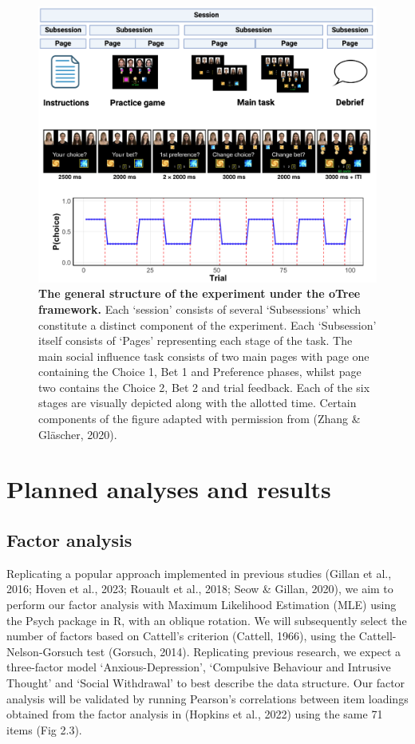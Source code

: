 \documentclass[12pt,a4paper,oneside,]{book} %
\begin{document}
\begin{figure}
\includegraphics[width=1\linewidth]{figures/otree_experiment} \caption{{\textbf{The general structure of the experiment under the oTree framework.} Each `session' consists of several `Subsessions' which constitute a distinct component of the experiment. Each `Subsession' itself consists of `Pages' representing each stage of the task. The main social influence task consists of two main pages with page one containing the Choice 1, Bet 1 and Preference phases, whilst page two contains the Choice 2, Bet 2 and trial feedback. Each of the six stages are visually depicted along with the allotted time. Certain components of the figure adapted with permission from (Zhang \& Gläscher, 2020).}}\label{fig:figure-2-otree}
\end{figure}



\section{Planned analyses and results}\label{planned-analyses-and-results}

\subsection{Factor analysis}\label{factor-analysis}

Replicating a popular approach implemented in previous studies (Gillan et al., 2016; Hoven et al., 2023; Rouault et al., 2018; Seow \& Gillan, 2020), we aim to perform our factor analysis with Maximum Likelihood Estimation (MLE) using the Psych package in R, with an oblique rotation. We will subsequently select the number of factors based on Cattell's criterion (Cattell, 1966), using the Cattell-Nelson-Gorsuch test (Gorsuch, 2014). Replicating previous research, we expect a three-factor model `Anxious-Depression', `Compulsive Behaviour and Intrusive Thought' and `Social Withdrawal' to best describe the data structure. Our factor analysis will be validated by running Pearson's correlations between item loadings obtained from the factor analysis in (Hopkins et al., 2022) using the same 71 items (Fig 2.3).
\end{document}
